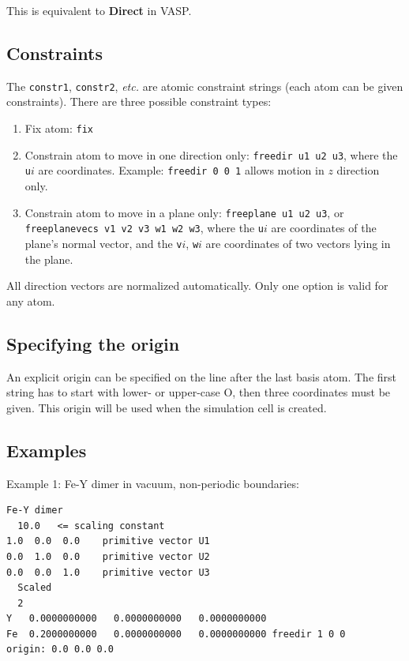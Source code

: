 \documentclass[a4paper,12pt,pdftex,onecolumn]{article}
\newcommand{\etc}{\emph{etc.}\xspace}
\begin{document}
This is equivalent to \textbf{Direct} in VASP.






\subsection{Constraints}

The \verb+constr1+, \verb+constr2+, \etc are atomic constraint strings
(each atom can be given constraints).
There are three possible constraint types:

\begin{enumerate}
\item Fix atom: \verb+fix+

\item Constrain atom to move in one direction only: \verb+freedir u1 u2 u3+,
where the \verb+u+$i$ are coordinates.
Example: \verb+freedir 0 0 1+ allows motion in $z$ direction only.

\item Constrain atom to move in a plane only: \verb+freeplane u1 u2 u3+, or
\newline
\verb+freeplanevecs v1 v2 v3 w1 w2 w3+,
where the \verb+u+$i$ are coordinates of the plane's normal vector, and
the \verb+v+$i$, \verb+w+$i$ are coordinates of two vectors lying in the plane.
\end{enumerate}

All direction vectors are normalized automatically. Only one option is valid for any
atom.






\subsection{Specifying the origin}

An explicit origin can be specified on the line after the last basis atom.
The first string has to start with lower- or upper-case O, then three coordinates
must be given. This origin will be used when the simulation cell is created.



\subsection{Examples}


Example 1: Fe-Y dimer in vacuum, non-periodic boundaries:

\begin{Verbatim}[fontsize=\relsize{-1},frame=single]
Fe-Y dimer
  10.0   <= scaling constant
1.0  0.0  0.0    primitive vector U1
0.0  1.0  0.0    primitive vector U2
0.0  0.0  1.0    primitive vector U3
  Scaled
  2
Y   0.0000000000   0.0000000000   0.0000000000
Fe  0.2000000000   0.0000000000   0.0000000000 freedir 1 0 0
origin: 0.0 0.0 0.0
\end{Verbatim}
\end{document}
